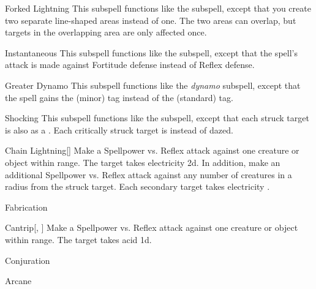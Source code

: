 \begin{ability}[\nth{3}]{Forked Lightning}
This subspell functions like the  subspell, except that you create two separate line-shaped areas instead of one.
The two areas can overlap, but targets in the overlapping area are only affected once.
\end{ability}
\vspace{0.25em}


\begin{ability}[\nth{4}]{Instantaneous}
This subspell functions like the  subspell, except that the spell's attack is made against Fortitude defense instead of Reflex defense.
\end{ability}
\vspace{0.25em}


\begin{ability}[\nth{5}]{Greater Dynamo}
This subspell functions like the \textit{dynamo} subspell, except that the spell gains the  (minor) tag instead of the  (standard) tag.
\end{ability}
\vspace{0.25em}


\begin{ability}[\nth{5}]{Shocking}
This subspell functions like the  subspell, except that each struck target is also  as a .
Each critically struck target is  instead of dazed.
\end{ability}
\vspace{0.25em}


\begin{ability}[\nth{6}]{Chain Lightning}[]
Make a Spellpower vs. Reflex attack against one creature or object within \rngmed range.
\hit The target takes electricity  \plus2d.
In addition, make an additional Spellpower vs. Reflex attack against any number of creatures in a \areamed radius from the struck target.
\hit Each secondary target takes electricity .
\end{ability}
\vspace{0.25em}

\newpage
\begin{spellsection}{Fabrication}

\begin{spellheader}
\end{spellheader}


\begin{ability}{Cantrip}[, ]
Make a Spellpower vs. Reflex attack against one creature or object within \rngmed range.
\hit The target takes acid  \minus1d.
\end{ability}




 Conjuration

 Arcane
\end{spellsection}


